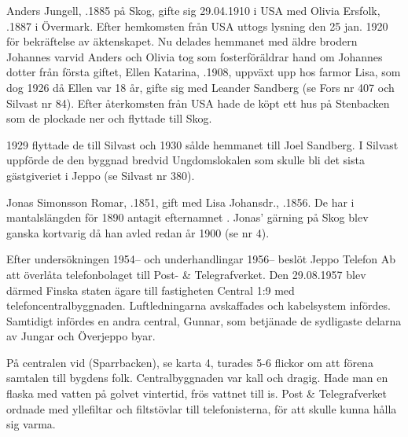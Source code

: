 %
Anders Jungell, .1885 på Skog, gifte sig  29.04.1910 i USA med Olivia Ersfolk, .1887 i Övermark. Efter hemkomsten från USA uttogs lysning den 25 jan. 1920 för bekräftelse av äktenskapet. Nu delades hemmanet med äldre brodern Johannes varvid Anders och Olivia tog som fosterföräldrar hand om Johannes dotter från första giftet, Ellen Katarina, .1908, uppväxt upp hos farmor Lisa, som dog 1926 då Ellen var 18 år, gifte sig med Leander Sandberg (se Fors nr 407 och Silvast nr 84). Efter återkomsten från USA hade de  köpt  ett hus på Stenbacken som de plockade ner och flyttade till Skog.

1929 flyttade de till Silvast och 1930 sålde hemmanet till Joel Sandberg. I Silvast uppförde de den byggnad bredvid Ungdomslokalen som skulle bli det sista gästgiveriet i Jeppo (se Silvast nr 380).


%
Jonas Simonsson Romar, .1851, gift med Lisa Johansdr., .1856. De har i mantalslängden för 1890 antagit efternamnet . Jonas' gärning på Skog blev ganska kortvarig då han avled redan år 1900 (se nr 4).



%



%
Efter undersökningen 1954-- och underhandlingar 1956-- beslöt	Jeppo Telefon Ab att överlåta telefonbolaget till Post- \& Telegrafverket. Den 29.08.1957 blev därmed Finska staten ägare till fastigheten Central 1:9 med telefoncentralbyggnaden. Luftledningarna avskaffades och kabelsystem infördes. Samtidigt infördes en andra central, Gunnar, som betjänade de sydligaste delarna av Jungar och Överjeppo byar.

På centralen vid  (Sparrbacken), se karta 4, turades 5-6 flickor om att förena samtalen till bygdens folk. Centralbyggnaden var kall och dragig. Hade man en flaska med vatten på golvet vintertid, frös vattnet till is. Post \& Telegrafverket ordnade med yllefiltar och filtstövlar till telefonisterna, för att skulle kunna hålla sig varma.

